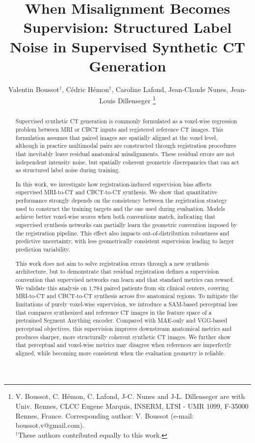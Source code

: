 \documentclass[lettersize,journal]{IEEEtran}
\begin{document}
\title{When Misalignment Becomes Supervision: Structured Label Noise in Supervised Synthetic CT Generation}

\author{Valentin Boussot$^{\dagger}$, Cédric Hémon$^{\dagger}$, Caroline Lafond, Jean-Claude Nunes, Jean-Louis Dillenseger
\thanks{V. Boussot, C. Hémon, C. Lafond, J-C. Nunes and J-L. Dillenseger are with Univ. Rennes, CLCC Eugene Marquis, INSERM, LTSI - UMR 1099, F-35000 Rennes, France. Corresponding author: V. Boussot (e-mail: boussot.v@gmail.com).\\
$^{\dagger}$These authors contributed equally to this work.}}

\maketitle

\begin{abstract}

Supervised synthetic CT generation is commonly formulated as a voxel-wise regression problem between MRI or CBCT inputs and registered reference CT images. This formulation assumes that paired images are spatially aligned at the voxel level, although in practice multimodal pairs are constructed through registration procedures that inevitably leave residual anatomical misalignments. These residual errors are not independent intensity noise, but spatially coherent geometric discrepancies that can act as structured label noise during training.

In this work, we investigate how registration-induced supervision bias affects supervised MRI-to-CT and CBCT-to-CT synthesis. We show that quantitative performance strongly depends on the consistency between the registration strategy used to construct the training targets and the one used during evaluation. Models achieve better voxel-wise scores when both conventions match, indicating that supervised synthesis networks can partially learn the geometric convention imposed by the registration pipeline. This effect also impacts out-of-distribution robustness and predictive uncertainty, with less geometrically consistent supervision leading to larger prediction variability.

This work does not aim to solve registration errors through a new synthesis architecture, but to demonstrate that residual registration defines a supervision convention that supervised networks can learn and that standard metrics can reward. We validate this analysis on 1,784 paired patients from six clinical centers, covering MRI-to-CT and CBCT-to-CT synthesis across five anatomical regions. To mitigate the limitations of purely voxel-wise supervision, we introduce a SAM-based perceptual loss that compares synthesized and reference CT images in the feature space of a pretrained Segment Anything encoder. Compared with MAE-only and VGG-based perceptual objectives, this supervision improves downstream anatomical metrics and produces sharper, more structurally coherent synthetic CT images. We further show that perceptual and voxel-wise metrics may disagree when references are imperfectly aligned, while becoming more consistent when the evaluation geometry is reliable.


\end{abstract}
\end{document}
